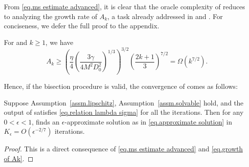 \documentclass{mcom-l}
\numberwithin{equation}{section}
\begin{document}
From \eqref{eq.ms estimate advanced}, it is clear that the oracle complexity of  reduces to analyzing the growth rate of $A_k$, a task already addressed in \citet[Lemma 4.2]{monteiro2013accelerated} and \citet[Lemma 4.3.5]{nesterov_lectures_2018}. For conciseness, we defer the full proof to the appendix.
\begin{lemma}
    \label{lem.growth of Ak}
    For and $k\geq 1$, we have
    \begin{equation}
        \label{eq.growth of Ak}
        A_k \geq \left(\frac{\eta}{4}\left (\frac{3\gamma}{4M^2D_0^2}\right)^{1/3}\right)^{3 / 2}\left(\frac{2 k+1}{3}\right)^{7/2} = \Omega(k^{7/2}).
    \end{equation}
\end{lemma}
Hence, if the bisection procedure is valid, the convergence of  comes as follows:
\begin{theorem}\label{thm.outer loop complexity}
    Suppose Assumption~\ref{assm.lipschitz},  Assumption~\ref{assm.solvable} hold, and the output of  satisfies \eqref{eq.relation lambda sigma} for all the iterations. Then for any $0<\epsilon<1$,  finds an $\epsilon$-approximate solution as in \eqref{eq.approximate solution} in $K_\epsilon= O(\epsilon^{-2/7})$ iterations.
\end{theorem}
\begin{proof}
    This is a direct consequence of \eqref{eq.ms estimate advanced} and \eqref{eq.growth of Ak}.
\end{proof}
\end{document}
